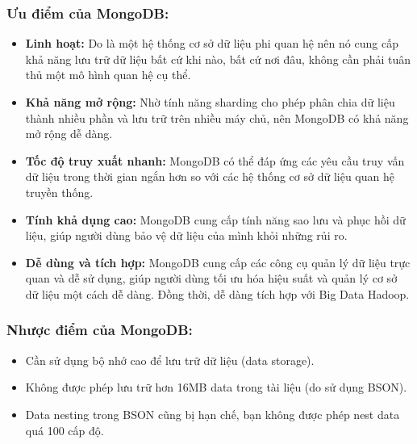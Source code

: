 \subsubsection{Ưu điểm của MongoDB:}
\begin{itemize}
    \item \textbf{Linh hoạt:} Do là một hệ thống cơ sở dữ liệu phi quan hệ nên nó cung cấp khả năng lưu trữ dữ liệu bất cứ khi nào, bất cứ nơi đâu, không cần phải tuân thủ một mô hình quan hệ cụ thể.
    \item \textbf{Khả năng mở rộng:} Nhờ tính năng sharding cho phép phân chia dữ liệu thành nhiều phần và lưu trữ trên nhiều máy chủ, nên MongoDB có khả năng mở rộng dễ dàng.
    \item \textbf{Tốc độ truy xuất nhanh:} MongoDB có thể đáp ứng các yêu cầu truy vấn dữ liệu trong thời gian ngắn hơn so với các hệ thống cơ sở dữ liệu quan hệ truyền thống.
    \item \textbf{Tính khả dụng cao:} MongoDB cung cấp tính năng sao lưu và phục hồi dữ liệu, giúp người dùng bảo vệ dữ liệu của mình khỏi những rủi ro.
    \item \textbf{Dễ dùng và tích hợp:} MongoDB cung cấp các công cụ quản lý dữ liệu trực quan và dễ sử dụng, giúp người dùng tối ưu hóa hiệu suất và quản lý cơ sở dữ liệu một cách dễ dàng. Đồng thời, dễ dàng tích hợp với Big Data Hadoop.
\end{itemize}

\subsubsection{Nhược điểm của MongoDB:}
\begin{itemize}
    \item Cần sử dụng bộ nhớ cao để lưu trữ dữ liệu (data storage).
    \item Không được phép lưu trữ hơn 16MB data trong tài liệu (do sử dụng BSON).
    \item Data nesting trong BSON cũng bị hạn chế, bạn không được phép nest data quá 100 cấp độ.
\end{itemize}

